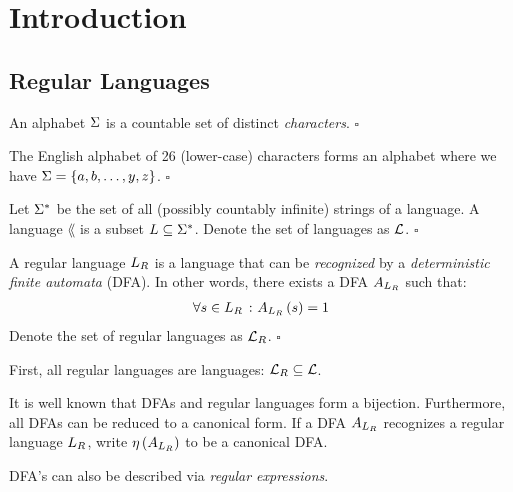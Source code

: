 \section{Introduction}

\subsection{Regular Languages}

\begin{definition}[Alphabet]
  An alphabet \(\Sigma\) is a countable set of distinct
  \textit{characters}.
  \hfill\(\square\)
\end{definition}

\begin{example}
  The English alphabet of 26 (lower-case) characters forms an alphabet
  where we have
  \(\Sigma = \left\{a, b, \ldots, y, z\right\}\).
  \hfill\(\square\)
\end{example}

\begin{definition}[Language]
  Let \(\Sigma^\ast\) be the set of all (possibly countably infinite)
  strings of a language.
  A language \(\lang\) is a subset \(L \subseteq \Sigma^\ast\).
  Denote the set of languages as \(\mathcal{L}\).
  \hfill\(\square\)
\end{definition}

\begin{definition}
  A regular language \(L_{R}\) is a language that can be
  \textit{recognized} by a \textit{deterministic finite automata} (DFA).
  In other words, there exists a DFA \(A_{L_{R}}\) such that:
  \begin{align*}
    \forall s \in L_{R} \ \colon A_{L_{R}}\left(s\right) = 1
  \end{align*}
  Denote the set of regular languages as \(\mathcal{L}_R\).
  \hfill\(\square\)
\end{definition}

First, all regular languages are languages: \(\mathcal{L}_R \subseteq \mathcal{L}\).

It is well known that DFAs and regular languages form a bijection.
Furthermore, all DFAs can be reduced to a canonical form.
If a DFA \(A_{L_{R}}\) recognizes a regular language \(L_{R}\),
write \(\eta\left(A_{L_{R}}\right)\) to be a canonical DFA.

DFA's can also be described via \textit{regular expressions}.

